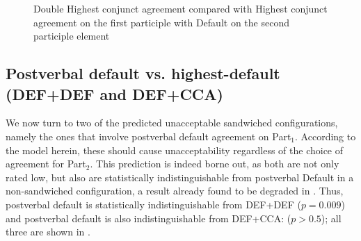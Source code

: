 \documentclass[output=paper
,modfonts
,nonflat]{langsci/langscibook}
\begin{document}
\begin{figure}  
\caption{Double Highest conjunct agreement compared with Highest conjunct agreement on the first participle with Default on the second participle element\label{fig:figure_hca_hcadef}}
\end{figure}

\subsection{Postverbal default vs. highest-default (DEF+DEF and DEF+CCA)} \label{sec:postverbaldef}
We now turn to two of the predicted unacceptable sandwiched configurations, namely the ones that involve postverbal default agreement on Part$_1$. According to the model herein, these should cause unacceptability regardless of the choice of agreement for Part$_2$. This prediction is indeed borne out, as both are not only rated low, but also are statistically indistinguishable from postverbal Default in a non-sandwiched configuration, a result already found to be degraded in \citet{willergold:16}. Thus, postverbal default is statistically indistinguishable from DEF+DEF ($p = 0.009$) and postverbal default is also indistinguishable from DEF+CCA: ($p > 0.5$); all three are shown in .\largerpage[2]

\end{document}
